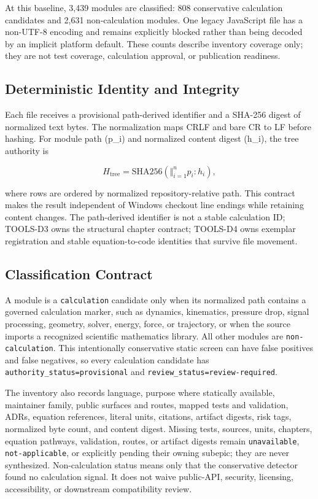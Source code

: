 \documentclass[
  american,
]{article}
\begin{document}
At this baseline, 3,439 modules are classified: 808 conservative
calculation candidates and 2,631 non-calculation modules. One legacy
JavaScript file has a non-UTF-8 encoding and remains explicitly blocked
rather than being decoded by an implicit platform default. These counts
describe inventory coverage only; they are not test coverage,
calculation approval, or publication readiness.

\subsection{Deterministic Identity and
Integrity}\label{deterministic-identity-and-integrity}

Each file receives a provisional path-derived identifier and a SHA-256
digest of normalized text bytes. The normalization maps CRLF and bare CR
to LF before hashing. For module path (p\_i) and normalized content
digest (h\_i), the tree authority is

\[
H_{\mathrm{tree}} = \mathrm{SHA256}\left(
  \Vert_{i=1}^{n} p_i : h_i
\right),
\]

where rows are ordered by normalized repository-relative path. This
contract makes the result independent of Windows checkout line endings
while retaining content changes. The path-derived identifier is not a
stable calculation ID; TOOLS-D3 owns the structural chapter contract;
TOOLS-D4 owns exemplar registration and stable equation-to-code
identities that survive file movement.

\subsection{Classification Contract}\label{classification-contract}

A module is a \texttt{calculation} candidate only when its normalized
path contains a governed calculation marker, such as dynamics,
kinematics, pressure drop, signal processing, geometry, solver, energy,
force, or trajectory, or when the source imports a recognized scientific
mathematics library. All other modules are \texttt{non-calculation}.
This intentionally conservative static screen can have false positives
and false negatives, so every calculation candidate has
\texttt{authority\_status=provisional} and
\texttt{review\_status=review-required}.

The inventory also records language, purpose where statically available,
maintainer family, public surfaces and routes, mapped tests and
validation, ADRs, equation references, literal units, citations,
artifact digests, risk tags, normalized byte count, and content digest.
Missing tests, sources, units, chapters, equation pathways, validation,
routes, or artifact digests remain \texttt{unavailable},
\texttt{not-applicable}, or explicitly pending their owning subepic;
they are never synthesized. Non-calculation status means only that the
conservative detector found no calculation signal. It does not waive
public-API, security, licensing, accessibility, or downstream
compatibility review.
\end{document}
